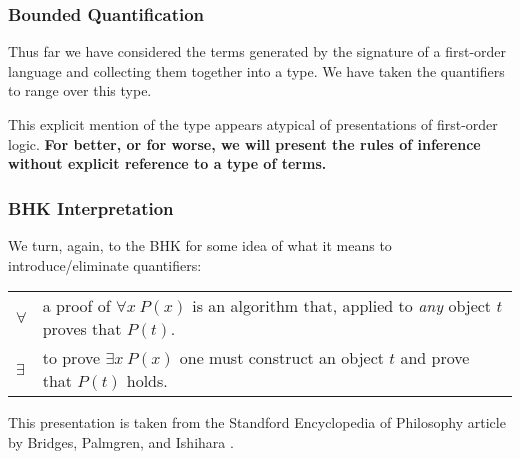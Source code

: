 \documentclass{beamer}
\theoremstyle{indentDefn} \newtheorem{defn}[]{Definition}
\begin{document}
\begin{frame}
	\frametitle{Bounded Quantification}

	Thus far we have considered the terms generated by the signature of a first-order language and collecting them together into a type. We have taken the quantifiers to range over this type. 

	\vspace{3cm}

	This explicit mention of the type appears atypical of presentations of first-order logic. {\bf For better, or for worse, we will present the rules of inference without explicit reference to a type of terms.}

\end{frame}

\begin{frame}
	\frametitle{BHK Interpretation}
	
	We turn, again, to the BHK for some idea of what it means to introduce/eliminate quantifiers: 
	
	\vspace{0.2cm}
	
	\begin{center}
		\begin{tabular}{p{1.5cm}p{8cm}}
		$\forall$ & a proof of $\forall x \ P(x)$ is an algorithm that, applied to \emph{any} object $t$ proves that $P(t)$.\\
		$\exists$ & to prove $\exists x \ P(x)$ one must construct an object $t$ and prove that $P(t)$ holds. 
		\end{tabular}
	\end{center}
	
	This presentation is taken from the Standford Encyclopedia of Philosophy article by Bridges, Palmgren, and Ishihara \cite{sep-mathematics-constructive}.

\end{frame}
\end{document}
